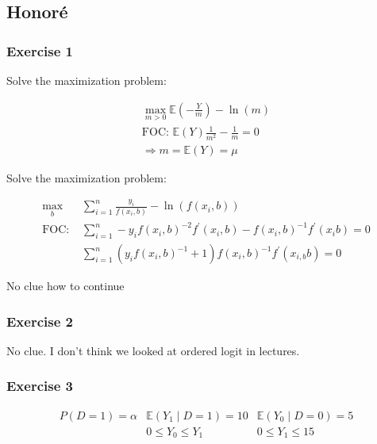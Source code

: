 {
\subsection*{Honor\'e}

{
\subsubsection*{Exercise 1}

\begin{enumerate}[label=(\alph*)]
{\item 
Solve the maximization problem:

$$
\begin{aligned}
    \max _{m>0} \mathbb{E}\left(-\frac{Y}{m}\right)-\ln (m) \\
    \text{FOC: }\mathbb{E}(Y) \frac{1}{m^{2}}-\frac{1}{m}=0 \\
    \Rightarrow m=\mathbb{E}(Y)=\mu
\end{aligned}
$$
}
{\item 
Solve the maximization problem:

$$
\begin{aligned}
    \max _{b} &\sum_{i=1}^{n} \frac{y_{i}}{f\left(x_{i}, b\right)}-\ln \left(f\left(x_{i}, b\right)\right) \\
    \text{FOC: } &\sum_{i=1}^{n}-y_{i} f\left(x_{i}, b\right)^{-2} f^{\prime}\left(x_{i}, b\right)-f\left(x_{i}, b\right)^{-1} f^{\prime}\left(x_{i} b\right)=0 \\
    &\sum_{i=1}^{n}\left(y_{i} f\left(x_{i}, b\right)^{-1}+1\right) f\left(x_{i}, b\right)^{-1} f^{\prime}\left(x_{i, b} b\right)=0
\end{aligned}
$$

\color{red} No clue how to continue \color{black}
}
\end{enumerate}
}
{
\subsubsection*{Exercise 2}

\color{red} No clue. I don't think we looked at ordered logit in lectures. \color{black}
}
{
\subsubsection*{Exercise 3}

$$
\begin{array}{lll}
P(D=1)=\alpha & \mathbb{E}\left(Y_{1} \mid D=1\right)=10 & \mathbb{E}\left(Y_{0} \mid D=0\right)=5 \\
& 0 \leq Y_{0} \leq Y_{1} & 0 \leq Y_{1} \leq 15
\end{array}
$$

}}
